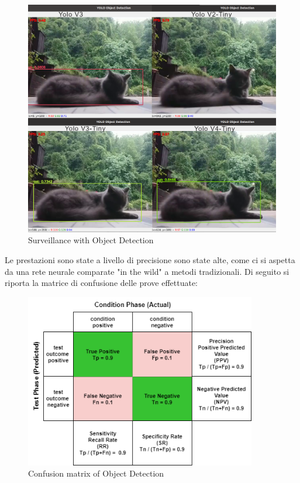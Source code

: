     \begin{figure}[H]
        \caption{Surveillance with Object Detection}
        \label{fig:ODcomparison}
        \centering
        \includegraphics[width=1\textwidth]{Images/ODcomparison.png}
    \end{figure}
    
    Le prestazioni sono state a livello di precisione sono state alte, come ci si aspetta da una rete neurale comparate "in the wild" a metodi tradizionali. Di seguito si riporta la matrice di confusione delle prove effettuate:
    
    \begin{figure}[H]
        \caption{Confusion matrix of Object Detection}
        \label{fig:ODmatrix}
        \centering
        \includegraphics[width=0.9\textwidth]{DrawIo/ConfusionMatrixObjDet.png}
    \end{figure}